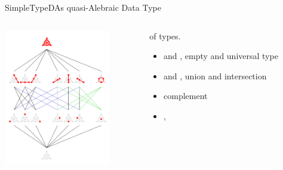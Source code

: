 \begin{frame}{SimpleTypeD}{As quasi-Alebraic Data Type}

  \begin{columns}

    \begin{column}{0.4\textwidth}
  
      \includegraphics[height=6cm]{Fano_plane_Hasse_diagram} 
    \end{column}
    \begin{column}{0.6\textwidth}%
       of types.

      \medskip
      
  \begin{itemize}
  \item {} and , empty and universal type
  \item {} and , union and intersection
  \item {} complement
  \item \eg, 
  \end{itemize}
      
    \end{column}
  \end{columns}
  
\end{frame}

\newsavebox\adtbox
\begin{lrbox}{\adtbox}
  \begin{minipage}{11cm}
    
  \end{minipage}
\end{lrbox}






